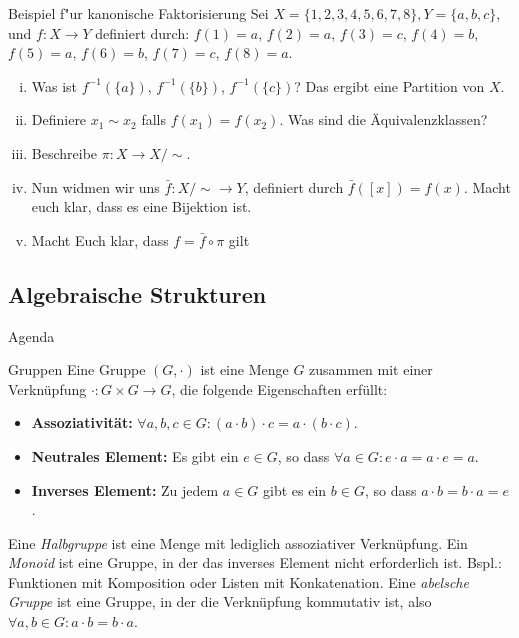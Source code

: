 \documentclass{beamer}
\begin{document}
\begin{frame}{Beispiel f"ur kanonische Faktorisierung}
Sei $X = \{1,2,3,4,5,6,7,8\}, Y=\{a,b,c\}$, und $f:X\to Y$ definiert durch: $f(1) = a$, $f(2) = a$, $f(3) = c$, $f(4) = b$, $f(5) = a$, $f(6) = b$, $f(7) = c$, $f(8) = a$. 
  \begin{enumerate}[(i)]
    \item Was ist $f^{-1}(\{a\})$, $f^{-1}(\{b\})$, $f^{-1}(\{c\})$? Das ergibt eine Partition von $X$.
    \item Definiere $x_1\sim x_2$ falls $f(x_1) = f(x_2)$. Was sind die \"Aquivalenzklassen? 
    \item Beschreibe $\pi : X\to X/\sim$. 
    \item Nun widmen wir uns $\bar{f} : X/\sim\to Y$, definiert durch $\bar{f}([x]) = f(x)$. Macht euch klar, dass es eine Bijektion ist. 
   \item Macht Euch klar, dass $f = \bar{f}\circ\pi$ gilt
  \end{enumerate}
\end{frame}

\subsection{Algebraische Strukturen}
\begin{frame}{Agenda}
   
    
  \tableofcontents[currentsection]
  \end{frame}
  
\begin{frame}{Gruppen}
Eine Gruppe $(G, \cdot)$ ist eine Menge $G$ zusammen mit einer Verknüpfung $\cdot : G \times G \to G$, die folgende Eigenschaften erfüllt:
\begin{itemize}
  \item \textbf{Assoziativität:} $\forall a,b,c \in G: (a \cdot b) \cdot c = a \cdot (b \cdot c)$.
  \item \textbf{Neutrales Element:} Es gibt ein $e \in G$, so dass $\forall a \in G: e \cdot a = a \cdot e = a$.
  \item \textbf{Inverses Element:} Zu jedem $a \in G$ gibt es ein $b \in G$, so dass $a \cdot b = b \cdot a = e$.
\end{itemize}
Eine \textit{Halbgruppe} ist eine Menge mit lediglich assoziativer Verknüpfung. 
Ein \textit{Monoid} ist eine Gruppe, in der das inverses Element nicht erforderlich ist. Bspl.: Funktionen mit Komposition oder Listen mit Konkatenation.
Eine \textit{abelsche Gruppe} ist eine Gruppe, in der die Verknüpfung kommutativ ist, also $\forall a,b \in G: a \cdot b = b \cdot a$.


\end{frame}
\end{document}
